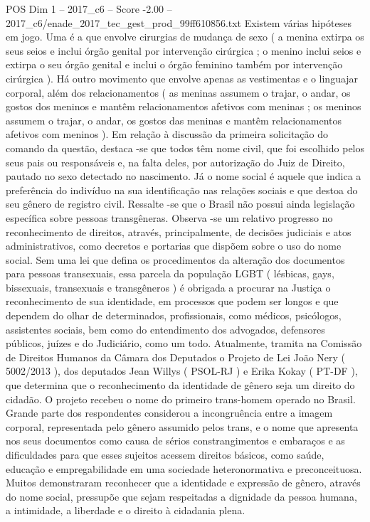 \begin{textsample}{POS Dim 1 – 2017\_c6 – Score -2.00 – 2017\_c6/enade\_2017\_tec\_gest\_prod\_99ff610856.txt}
Existem várias hipóteses em jogo.
Uma é a que envolve cirurgias de mudança de sexo ( a menina extirpa os seus seios e inclui órgão genital por intervenção cirúrgica ; o menino inclui seios e extirpa o seu órgão genital e inclui o órgão feminino também por intervenção cirúrgica ).
Há outro movimento que envolve apenas as vestimentas e o linguajar corporal, além dos relacionamentos ( as meninas assumem o trajar, o andar, os gostos dos meninos e mantêm relacionamentos afetivos com meninas ; os meninos assumem o trajar, o andar, os gostos das meninas e mantêm relacionamentos afetivos com meninos ).
Em relação à discussão da primeira solicitação do comando da questão, destaca -se que todos têm nome civil, que foi escolhido pelos seus pais ou responsáveis e, na falta deles, por autorização do Juiz de Direito, pautado no sexo detectado no nascimento.
Já o nome social é aquele que indica a preferência do indivíduo na sua identificação nas relações sociais e que destoa do seu gênero de registro civil.
Ressalte -se que o Brasil não possui ainda legislação específica sobre pessoas transgêneras.
Observa -se um relativo progresso no reconhecimento de direitos, através, principalmente, de decisões judiciais e atos administrativos, como decretos e portarias que dispõem sobre o uso do nome social.
Sem uma lei que defina os procedimentos da alteração dos documentos para pessoas transexuais, essa parcela da população LGBT ( lésbicas, gays, bissexuais, transexuais e transgêneros ) é obrigada a procurar na Justiça o reconhecimento de sua identidade, em processos que podem ser longos e que dependem do olhar de determinados, profissionais, como médicos, psicólogos, assistentes sociais, bem como do entendimento dos advogados, defensores públicos, juízes e do Judiciário, como um todo.
Atualmente, tramita na Comissão de Direitos Humanos da Câmara dos Deputados o Projeto de Lei João Nery ( 5002/2013 ), dos deputados Jean Willys ( PSOL-RJ ) e Erika Kokay ( PT-DF ), que determina que o reconhecimento da identidade de gênero seja um direito do cidadão.
O projeto recebeu o nome do primeiro trans-homem operado no Brasil.
Grande parte dos respondentes considerou a incongruência entre a imagem corporal, representada pelo gênero assumido pelos trans, e o nome que apresenta nos seus documentos como causa de sérios constrangimentos e embaraços e as dificuldades para que esses sujeitos acessem direitos básicos, como saúde, educação e empregabilidade em uma sociedade heteronormativa e preconceituosa.
Muitos demonstraram reconhecer que a identidade e expressão de gênero, através do nome social, pressupõe que sejam respeitadas a dignidade da pessoa humana, a intimidade, a liberdade e o direito à cidadania plena.

\end{textsample}

